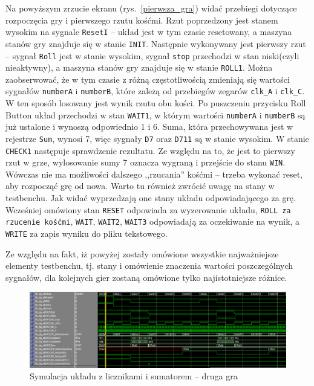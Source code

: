 \documentclass[a4paper,11pt,fleqn]{article}
\begin{document}
Na powyższym zrzucie ekranu (rys.~\ref{pierwsza_gra}) widać przebiegi dotyczące rozpoczęcia gry i pierwszego rzutu kośćmi. Rzut poprzedzony jest stanem wysokim na sygnale \texttt{ResetI} -- układ jest w tym czasie resetowany, a maszyna stanów gry znajduje się w stanie \texttt{INIT}. Następnie wykonywany jest pierwszy rzut -- sygnał \texttt{Roll} jest w stanie wysokim, sygnał \texttt{stop} przechodzi w stan niski(czyli nieaktywny), a maszyna stanów gry znajduje się w stanie \texttt{ROLL1}. Można zaobserwować, że w tym czasie z różną częstotliwością zmieniają się wartości sygnałów \texttt{numberA} i \texttt{numberB}, które zależą od przebiegów zegarów \texttt{clk\_A} i \texttt{clk\_C}. W ten sposób losowany jest wynik rzutu obu kości. Po puszczeniu przycisku Roll Button układ przechodzi w stan \texttt{WAIT1}, w którym wartości \texttt{numberA} i \texttt{numberB} są już ustalone i wynoszą odpowiednio 1 i 6. Suma, która przechowywana jest w rejestrze \texttt{Sum}, wynosi 7, więc sygnały \texttt{D7} oraz \texttt{D711} są w stanie wysokim. W stanie \texttt{CHECK1} następuje sprawdzenie rezultatu. Ze względu na to, że jest to pierwszy rzut w grze, wylosowanie sumy 7 oznacza wygraną i przejście do stanu \texttt{WIN}. Wówczas nie ma możliwości dalszego ,,rzucania'' kośćmi -- trzeba wykonać reset, aby rozpocząć grę od nowa. 
Warto tu również zwrócić uwagę na stany w testbenchu. Jak widać wyprzedzają one stany układu odpowiadającego za grę. Wcześniej omówiony stan \texttt{RESET} odpowiada za wyzerowanie układu, \texttt{ROLL za rzucenie kośćmi}, \texttt{WAIT}, \texttt{WAIT2}, \texttt{WAIT3} odpowiadają za oczekiwanie na wynik, a \texttt{WRITE} za zapis wyniku do pliku tekstowego.

Ze względu na fakt, iż powyżej zostały omówione wszystkie najważniejsze elementy testbenchu, tj. stany i omówienie znaczenia wartości poszczególnych sygnałów, dla kolejnych gier zostaną omówione tylko najistotniejsze różnice.

\begin{figure}[h]
\centering
\includegraphics[scale = 0.5]{screens/druga_gra_1.png}
\caption{Symulacja układu z licznikami i sumatorem -- druga gra}
\label{druga_gra_1}
\end{figure}
\end{document}
